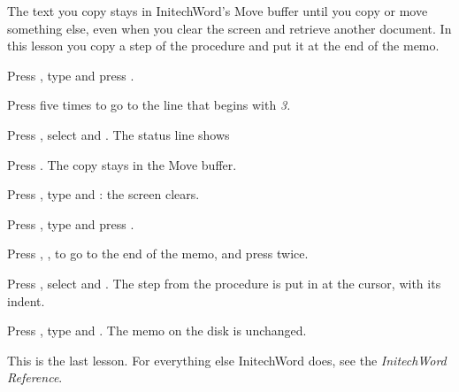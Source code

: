 The text you copy stays in InitechWord's Move buffer until you copy or move
something else, even when you clear the screen and retrieve another
document.  In this lesson you copy a step of the procedure and put it at the
end of the memo.

\begin{WPSteps}
\item Press , type  and press
.
\item Press  five times to go to the line that begins with
\textit{3.}
\item Press , select  and
.  The status line shows 
\item Press .  The copy stays in the Move buffer.
\item Press , type  and : the screen
clears.
\end{WPSteps}

\begin{WPSteps}
\item Press , type  and press
.
\item Press , ,  to go to the end
of the memo, and press  twice.
\item Press , select  and
.  The step from the procedure is put in at the cursor,
with its indent.
\end{WPSteps}

\begin{WPSteps}
\item Press , type  and .  The memo
on the disk is unchanged.
\end{WPSteps}
\EndReplay
This is the last lesson.  For everything else InitechWord does, see the
\textit{InitechWord Reference}.
